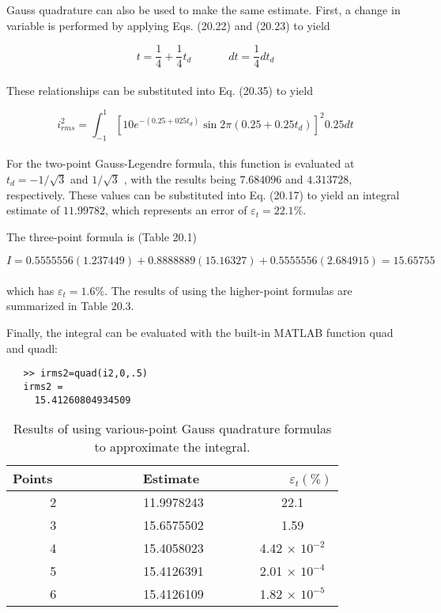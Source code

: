 \documentclass[../main.tex]{subfiles}
\begin{document}
Gauss quadrature can also be used to make the same estimate. First, a change in
variable is performed by applying Eqs. (20.22) and (20.23) to yield

	$$t= \dfrac{1}{4} + \dfrac{1}{4}t_{d} \; \; \; \; \; \; \; \; \; \; \; \; dt=\dfrac{1}{4} dt_{d} $$\\
These relationships can be substituted into Eq. (20.35) to yield

\begin{equation}
	\tag{20.36}
	i^{2}_{rms} = \int^{1}_{-1} [10e^{-(0.25+025t_{d})} \sin 2\pi (0.25+0.25t_{d})]^{2} 0.25 dt
\end{equation}\\
For the two-point Gauss-Legendre formula, this function is evaluated at $t_{d} = −1/\sqrt{3}$ and $1/\sqrt{3}$ , with the results being $7.684096$ and $4.313728$, respectively. These values can be
substituted into Eq. (20.17) to yield an integral estimate of $11.99782$, which represents an
error of $\varepsilon_{t} = 22.1\%$.

The three-point formula is (Table 20.1)

$$I = 0.5555556(1.237449) + 0.8888889(15.16327) + 0.5555556(2.684915) = 15.65755$$\\
which has $\varepsilon_{t} = 1.6\%$. The results of using the higher-point formulas are summarized in
Table 20.3.

Finally, the integral can be evaluated with the built-in MATLAB function quad and quadl:
\begin{verbatim}
   >> irms2=quad(i2,0,.5)
   irms2 =
     15.41260804934509
\end{verbatim}

\begin{table}[hbt!]
\caption{\textsf{Results of using various-point Gauss quadrature
formulas to approximate the integral.  }}
\centering
\begin{tabular}{ccc}
	\hline
	\textbf{Points} \ \ \ \ \ & \ \ \ \ \ \textbf{Estimate} \ \ \ \ \  & \ \ \ \ \  \textbf{$\varepsilon_{t} (\%)$}\\ \hline
	
	2 & 11.9978243 & 22.1\\

	3 & 15.6575502 & 1.59\\

	4 & 15.4058023 & 4.42 × $10^{-2}$\\
	
	5 & 15.4126391 & 2.01 × $10^{-4}$\\
	
	6 & 15.4126109 & 1.82 × $10^{-5}$\\ \hline
\end{tabular}
\end{table}
\end{document}
